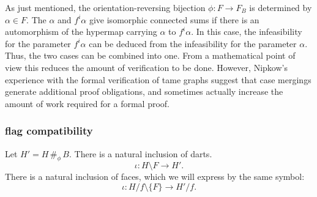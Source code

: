 \begin{remark} As just mentioned, the orientation-reversing bijection $\phi:F\to F_B$
is determined by $\alpha\in F$.  The $\alpha$ and $f^i\alpha$ give
isomorphic connected sums if there is an automorphism of the hypermap
carrying $\alpha$ to $f^i\alpha$.  In this case, the infeasibility
for the parameter $f^i\alpha$ can be deduced from the
infeasibility for the parameter $\alpha$.  Thus, the two cases can
be combined into one.  From a mathematical point of view this
reduces the amount of verification to be done.  However, Nipkow's
experience with the formal verification of tame graphs suggest
that case mergings generate additional proof obligations, and
sometimes actually increase the amount of work required for a
formal proof.
\end{remark}








\subsubsection{flag compatibility}
\label{sec:com}

Let $H'= H \,\#_\phi\, B$.   There is a natural inclusion of
darts.
    $$
    \iota: H\setminus F \to H'.
    $$
There is a natural inclusion of faces, which we will express by
the same symbol:
    $$
    \iota: H/f \setminus \{F\}\to H'/f.
    $$

